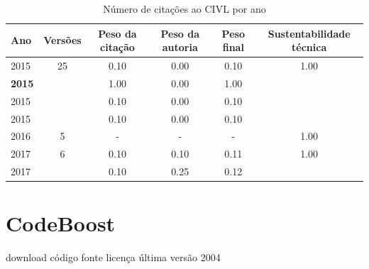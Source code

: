 \begin{table}[H]
\caption{Número de citações ao CIVL  por ano}
\centering
\begin{tabular}{| l | c | c | c | c | c |}
  \hline
  Ano & Versões & Peso da citação & Peso da autoria & Peso final & Sustentabilidade técnica \\
  \hline
            2015
          &
          25
          &
          0.10
          &
          0.00
          &
          0.10
          &
            {\color{blue} 1.00}
          \\
            {\bf 2015}
          &
          
          &
          1.00
          &
          0.00
          &
          1.00
          &
          \\
            2015
          &
          
          &
          0.10
          &
          0.00
          &
          0.10
          &
          \\
            2015
          &
          
          &
          0.10
          &
          0.00
          &
          0.10
          &
          \\
\hline
        2016 & 5 & - & - & -
        &
          {\color{blue} 1.00}
        \\
\hline
            2017
          &
          6
          &
          0.10
          &
          0.10
          &
          0.11
          &
            {\color{blue} 1.00}
          \\
            2017
          &
          
          &
          0.10
          &
          0.25
          &
          0.12
          &
          \\
\hline
\end{tabular}
\end{table}



\section{CodeBoost}
\checkmark download
\checkmark código fonte
\checkmark licença
\checkmark última versão 2004


